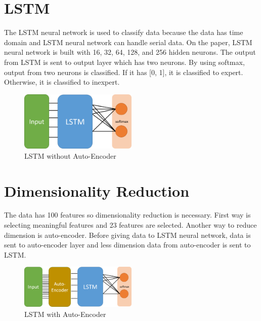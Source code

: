 \documentclass[draft,dvipsnames]{drexel-thesis}
\begin{document}
\begin{thesis}
\section{LSTM}
The LSTM neural network is used to classify data because the data has time domain and LSTM neural network can handle serial data. On the paper, LSTM neural network is built with 16, 32, 64, 128, and 256 hidden neurons. The output from LSTM is sent to output layer which has two neurons. By using softmax, output from two neurons is classified. If it has [0, 1], it is classified to expert. Otherwise, it is classified to inexpert.

\begin{figure}[H]
    \centering
    \includegraphics[width=0.5\textwidth]{pictures/applied_lstm.png}
    \caption{LSTM without Auto-Encoder}
    \label{fig:Applied LSTM}
\end{figure}

\section{Dimensionality Reduction}
The data has 100 features so dimensionality reduction is necessary. First way is selecting meaningful features and 23 features are selected. Another way to reduce dimension is auto-encoder. Before giving data to LSTM neural network, data is sent to auto-encoder layer and less dimension data from auto-encoder is sent to LSTM. 

\begin{figure}[H]
    \centering
    \includegraphics[width=0.5\textwidth]{pictures/applied_lstm_autoencoder.png}
    \caption{LSTM with Auto-Encoder}
    \label{fig:Applied LSTM With Auto-Encoder}
\end{figure}



\end{thesis}
\end{document}
